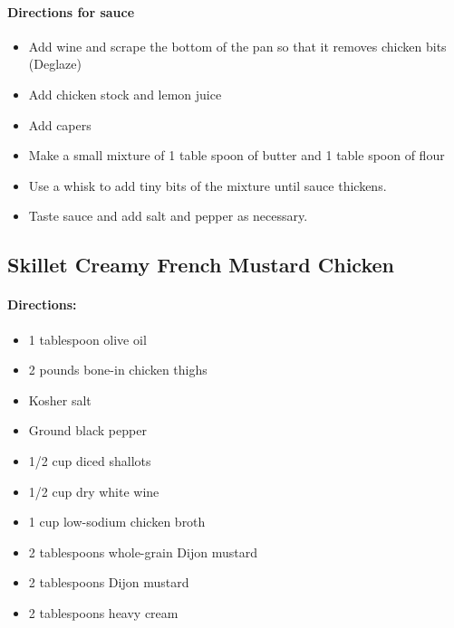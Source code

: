 \documentclass{article}
\begin{document}
\paragraph{Directions for sauce}
\begin{itemize}
	\item Add wine and scrape the bottom of the pan so that it removes chicken bits (Deglaze)
	\item Add chicken stock and lemon juice
	\item Add capers
	\item Make a small mixture of 1 table spoon of butter and 1 table spoon of flour
	\item Use a whisk to add tiny bits of the mixture until sauce thickens.
	\item Taste sauce and add salt and pepper as necessary.
\end{itemize}

\subsection{Skillet Creamy French Mustard Chicken}

\paragraph{Directions:}
\begin{itemize}
	\item 1 tablespoon olive oil
	\item 2 pounds bone-in chicken thighs
	\item Kosher salt
	\item Ground black pepper
	\item 1/2 cup diced shallots
	\item 1/2 cup dry white wine
	\item 1 cup low-sodium chicken broth
	\item 2 tablespoons whole-grain Dijon mustard
	\item 2 tablespoons Dijon mustard
	\item 2 tablespoons heavy cream	
\end{itemize}
\end{document}
